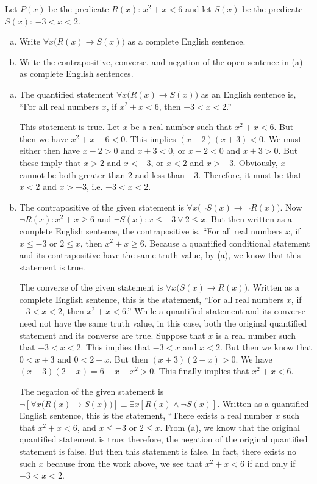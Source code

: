 \documentclass[11pt,letterpaper]{article}
\begin{document}
\newpage



 Let $P(x)$ be the predicate $R(x)$: $x^2 + x < 6$ and let $S(x)$ be the predicate $S(x)$: $-3 < x < 2$.  
	\begin{enumerate}[(a)]
	\item Write $\forall x \big( R(x) \to S(x) \big)$ as a complete English sentence.
	\item Write the contrapositive, converse, and negation of the open sentence in (a) as complete English sentences. 
	\end{enumerate} \pspace

\sol 
\begin{enumerate}[(a)]
\item The quantified statement $\forall x \big( R(x) \to S(x) \big)$ as an English sentence is, ``For all real numbers $x$, if $x^2 + x < 6$, then $-3 < x < 2$.'' \pspace

This statement is true. Let $x$ be a real number such that $x^2 + x < 6$. But then we have $x^2 + x - 6 < 0$. This implies $(x - 2)(x + 3) < 0$. We must either then have $x - 2 > 0$ and $x + 3 < 0$, or $x - 2 < 0$ and $x + 3 > 0$. But these imply that $x > 2$ and $x < -3$, or $x < 2$ and $x > -3$. Obviously, $x$ cannot be both greater than 2 and less than $-3$. Therefore, it must be that $x < 2$ and $x > -3$, i.e. $-3 < x < 2$. \pspace

\item The contrapositive of the given statement is $\forall x \big(\neg S(x) \to \neg R(x) \big)$. Now $\neg R(x): x^2 + x \geq 6$ and $\neg S(x): x \leq -3 \vee 2 \leq x$. But then written as a complete English sentence, the contrapositive is,  ``For all real numbers $x$, if $x \leq -3$ or $2 \leq x$, then $x^2 + x \geq 6$. Because a quantified conditional statement and its contrapositive have the same truth value, by (a), we know that this statement is true. \pspace

The converse of the given statement is $\forall x \big( S(x) \to R(x) \big)$. Written as a complete English sentence, this is the statement, ``For all real numbers $x$, if $-3 < x < 2$, then $x^2 + x < 6$.'' While a quantified statement and its converse need not have the same truth value, in this case, both the original quantified statement and its converse are true. Suppose that $x$ is a real number such that $-3 < x < 2$. This implies that $-3 < x$ and $x < 2$. But then we know that $0 < x + 3$ and $0 < 2 - x$. But then $(x + 3)(2 - x) > 0$. We have $(x + 3)(2 - x)= 6 - x - x^2 > 0$. This finally implies that $x^2 + x < 6$. \pspace

The negation of the given statement is $\neg [\forall x \big( R(x) \to S(x) \big) ] \equiv \exists x [ R(x) \wedge \neg S(x) ]$. Written as a quantified English sentence, this is the statement, ``There exists a real number $x$ such that $x^2 + x < 6$, and $x \leq -3$ or $2 \leq x$. From (a), we know that the original quantified statement is true; therefore, the negation of the original quantified statement is false. But then this statement is false. In fact, there exists no such $x$ because from the work above, we see that $x^2 + x < 6$ if and only if $-3 < x < 2$. 
\end{enumerate}
\end{document}
